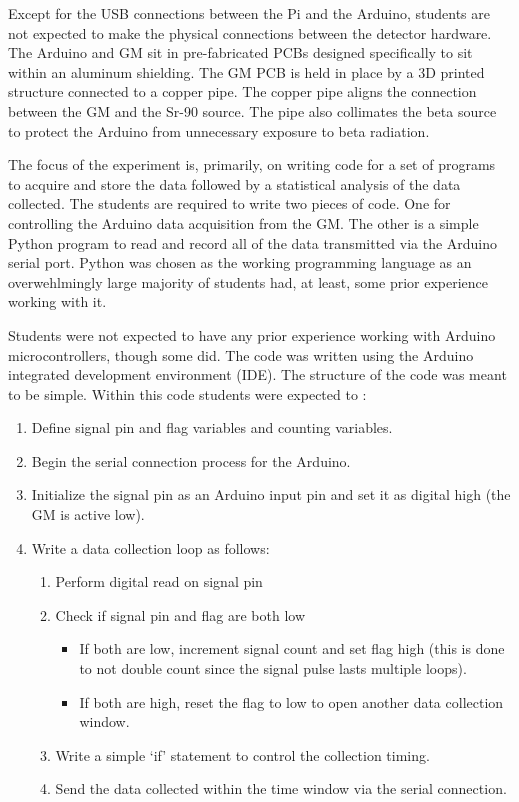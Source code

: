 Except for the USB connections between the Pi and the Arduino, students are not expected to make the physical connections between the detector hardware.
The Arduino and GM sit in pre-fabricated PCBs designed specifically to sit within an aluminum shielding.
The GM PCB is held in place by a 3D printed structure connected to a copper pipe.
The copper pipe aligns the connection between the GM and the Sr-90 source.
The pipe also collimates the beta source to protect the Arduino from unnecessary exposure to beta radiation.

The focus of the experiment is, primarily, on writing code for a set of programs to acquire and store the data followed by a statistical analysis of the data collected.
The students are required to write two pieces of code.
One for controlling the Arduino data acquisition from the GM.
The other is a simple Python program to read and record all of the data transmitted via the Arduino serial port.
Python was chosen as the working programming language as an overwehlmingly large majority of students had, at least, some prior experience working with it.

Students were not expected to have any prior experience working with Arduino microcontrollers, though some did.
The code was written using the Arduino integrated development environment (IDE).
The structure of the code was meant to be simple.
Within this code students were expected to :

\begin{enumerate}
\item Define signal pin and flag variables and counting variables.
\item Begin the serial connection process for the Arduino.
\item Initialize the signal pin as an Arduino input pin and set it as digital high (the GM is active low).
\item Write a data collection loop as follows:
  \begin{enumerate}
  \item Perform digital read on signal pin
  \item Check if signal pin and flag are both low
    \begin{itemize}
    \item If both are low, increment signal count and set flag high (this is done to not double count since the signal pulse lasts multiple loops).
    \item If both are high, reset the flag to low to open another data collection window.
    \end{itemize}
  \item Write a simple `if' statement to control the collection timing.
  \item Send the data collected within the time window via the serial connection.
  \end{enumerate}
  
      
\end{enumerate}

